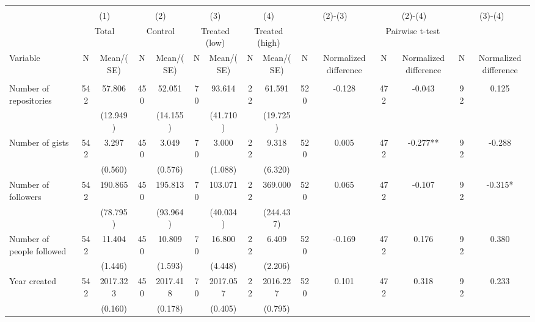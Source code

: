 \begin{tabular}{@{\extracolsep{5pt}}lcccccccccccccc}
\\[-1.8ex]\hline \hline \\[-1.8ex]
 & \multicolumn{2}{c}{(1)}  & \multicolumn{2}{c}{(2)}  & \multicolumn{2}{c}{(3)}  & \multicolumn{2}{c}{(4)}  & \multicolumn{2}{c}{(2)-(3)} & \multicolumn{2}{c}{(2)-(4)} & \multicolumn{2}{c}{(3)-(4)} \\
 & \multicolumn{2}{c}{Total}  & \multicolumn{2}{c}{Control}  & \multicolumn{2}{c}{Treated (low)}  & \multicolumn{2}{c}{Treated (high)}  & \multicolumn{6}{c}{Pairwise t-test}  \\
Variable & N & Mean/(SE) & N & Mean/(SE) & N & Mean/(SE) & N & Mean/(SE) & N & Normalized difference & N & Normalized difference & N & Normalized difference \\ \hline \\[-1.8ex] 
Number of repositories   & 542    & 57.806    & 450    & 52.051    & 70    & 93.614    & 22    & 61.591    & 520    & -0.128    & 472    & -0.043    & 92    & 0.125   \\
 &   & (12.949)  &   & (14.155)  &   & (41.710)  &   & (19.725)  &   &  &   &  &   &  \\ [1ex]
Number of gists   & 542    & 3.297    & 450    & 3.049    & 70    & 3.000    & 22    & 9.318    & 520    & 0.005    & 472    & -0.277**    & 92    & -0.288   \\
 &   & (0.560)  &   & (0.576)  &   & (1.088)  &   & (6.320)  &   &  &   &  &   &  \\ [1ex]
Number of followers   & 542    & 190.865    & 450    & 195.813    & 70    & 103.071    & 22    & 369.000    & 520    & 0.065    & 472    & -0.107    & 92    & -0.315*   \\
 &   & (78.795)  &   & (93.964)  &   & (40.034)  &   & (244.437)  &   &  &   &  &   &  \\ [1ex]
Number of people followed   & 542    & 11.404    & 450    & 10.809    & 70    & 16.800    & 22    & 6.409    & 520    & -0.169    & 472    & 0.176    & 92    & 0.380   \\
 &   & (1.446)  &   & (1.593)  &   & (4.448)  &   & (2.206)  &   &  &   &  &   &  \\ [1ex]
Year created   & 542    & 2017.323    & 450    & 2017.418    & 70    & 2017.057    & 22    & 2016.227    & 520    & 0.101    & 472    & 0.318    & 92    & 0.233   \\
 &   & (0.160)  &   & (0.178)  &   & (0.405)  &   & (0.795)  &   &  &   &  &   &  \\ [1ex]

\end{tabular}
